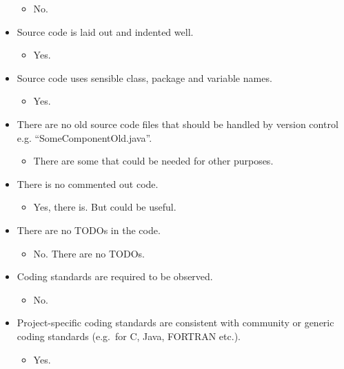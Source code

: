\begin{itemize}
  \begin{itemize}
  \itemsep1pt\parskip0pt
  \item
    No.
  \end{itemize}
\item
  Source code is laid out and indented well.

  \begin{itemize}
  \itemsep1pt\parskip0pt
  \item
    Yes.
  \end{itemize}
\item
  Source code uses sensible class, package and variable names.

  \begin{itemize}
  \itemsep1pt\parskip0pt
  \item
    Yes.
  \end{itemize}
\item
  There are no old source code files that should be handled by version
  control e.g. ``SomeComponentOld.java''.

  \begin{itemize}
  \itemsep1pt\parskip0pt
  \item
    There are some that could be needed for other purposes.
  \end{itemize}
\item
  There is no commented out code.

  \begin{itemize}
  \itemsep1pt\parskip0pt
  \item
    Yes, there is. But could be useful.
  \end{itemize}
\item
  There are no TODOs in the code.

  \begin{itemize}
  \itemsep1pt\parskip0pt
  \item
    No. There are no TODOs.
  \end{itemize}
\item
  Coding standards are required to be observed.

  \begin{itemize}
  \itemsep1pt\parskip0pt
  \item
    No.
  \end{itemize}
\item
  Project-specific coding standards are consistent with community or
  generic coding standards (e.g.~for C, Java, FORTRAN etc.).

  \begin{itemize}
  \itemsep1pt\parskip0pt
  \item
    Yes.
  \end{itemize}
\end{itemize}

